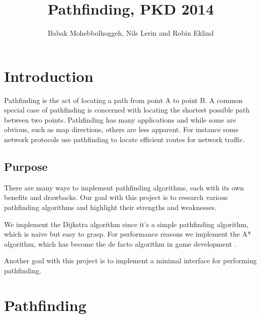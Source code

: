 \documentclass[12pt, a4paper]{article}
\title{Pathfinding, PKD 2014}
\author{Babak Mohebbolhoggeh, Nils Lerin and Robin Eklind}
\begin{document}
\maketitle

\pagebreak

\tableofcontents

\pagebreak


\section{Introduction}

Pathfinding is the act of locating a path from point A to point B. A common
special case of pathfinding is concerned with locating the shortest possible
path between two points. Pathfinding has many applications and while some are
obvious, such as map directions, others are less apparent. For instance some
network protocols use pathfinding to locate efficient routes for network
traffic.


\subsection{Purpose}

There are many ways to implement pathfinding algorithms, each with its own
benefits and drawbacks. Our goal with this project is to research various
pathfinding algorithms and highlight their strengths and weaknesses.

We implement the Dijkstra algorithm since it's a simple pathfinding algorithm,
which is naive but easy to grasp. For performance reasons we implement the A*
algorithm, which has become the de facto algorithm in game development
\cite{astar1, defacto}.

Another goal with this project is to implement a minimal interface for
performing pathfinding.


\section{Pathfinding}
\label{Pathfinding}

\end{document}
